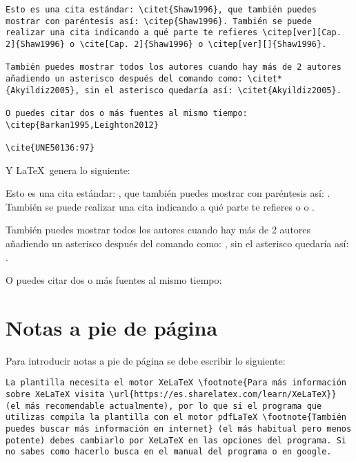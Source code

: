 \begin{lstlisting}[style=Latex-color]
Esto es una cita estándar: \citet{Shaw1996}, que también puedes mostrar con paréntesis así: \citep{Shaw1996}. También se puede realizar una cita indicando a qué parte te refieres \citep[ver][Cap. 2]{Shaw1996} o \cite[Cap. 2]{Shaw1996} o \citep[ver][]{Shaw1996}. 

También puedes mostrar todos los autores cuando hay más de 2 autores añadiendo un asterisco después del comando como: \citet*{Akyildiz2005}, sin el asterisco quedaría así: \citet{Akyildiz2005}.

O puedes citar dos o más fuentes al mismo tiempo: \citep{Barkan1995,Leighton2012}

\cite{UNE50136:97}

\end{lstlisting}
Y \LaTeX~genera lo siguiente:
\\
\par Esto es una cita estándar: \citet{Shaw1996}, que también puedes mostrar con paréntesis así: \citep{Shaw1996}. También se puede realizar una cita indicando a qué parte te refieres \citep[ver][Cap. 2]{Shaw1996} o \citep[Cap. 2]{Shaw1996} o \citep[ver][]{Shaw1996}. 
\\
\par También puedes mostrar todos los autores cuando hay más de 2 autores añadiendo un asterisco después del comando como: \citet*{Akyildiz2005}, sin el asterisco quedaría así: \citet{Akyildiz2005}.
\\
\par O puedes citar dos o más fuentes al mismo tiempo: \citep{Barkan1995,Leighton2012}


\section{Notas a pie de página}

Para introducir notas a pie de página se debe escribir lo siguiente:

\begin{lstlisting}[style=Latex-color]
	La plantilla necesita el motor XeLaTeX \footnote{Para más información sobre XeLaTeX visita \url{https://es.sharelatex.com/learn/XeLaTeX}} (el más recomendable actualmente), por lo que si el programa que utilizas compila la plantilla con el motor pdfLaTeX \footnote{También puedes buscar más información en internet} (el más habitual pero menos potente) debes cambiarlo por XeLaTeX en las opciones del programa. Si no sabes como hacerlo busca en el manual del programa o en google.
\end{lstlisting}

